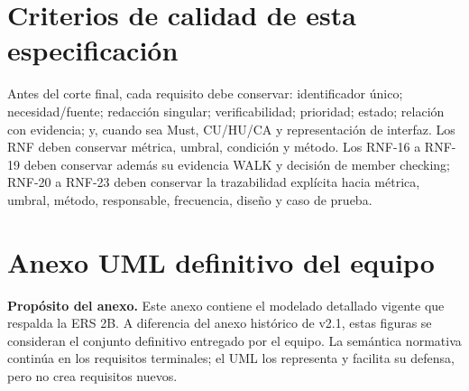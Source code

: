 \documentclass[11pt,a4paper,twoside]{article}
\begin{document}
\section{Criterios de calidad de esta especificación}
Antes del corte final, cada requisito debe conservar: identificador único; necesidad/fuente; redacción singular; verificabilidad; prioridad; estado; relación con evidencia; y, cuando sea Must, CU/HU/CA y representación de interfaz. Los RNF deben conservar métrica, umbral, condición y método. Los RNF-16 a RNF-19 deben conservar además su evidencia WALK y decisión de member checking; RNF-20 a RNF-23 deben conservar la trazabilidad explícita hacia métrica, umbral, método, responsable, frecuencia, diseño y caso de prueba.



\section{Anexo UML definitivo del equipo}
\begin{importantbox}
\textbf{Propósito del anexo.} Este anexo contiene el modelado detallado vigente que respalda la ERS 2B. A diferencia del anexo histórico de v2.1, estas figuras se consideran el conjunto definitivo entregado por el equipo. La semántica normativa continúa en los requisitos terminales; el UML los representa y facilita su defensa, pero no crea requisitos nuevos.
\end{importantbox}
\end{document}
